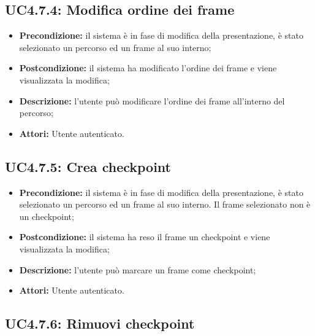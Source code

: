 \subsection{ UC4.7.4: Modifica ordine dei frame}

\begin{itemize}
	\item \textbf{Precondizione:} il sistema è in fase di modifica della presentazione, è stato selezionato un percorso ed un frame al suo interno;
	\item \textbf{Postcondizione:} il sistema ha modificato l'ordine dei frame e viene visualizzata la modifica;
	\item \textbf{Descrizione:} l'utente può modificare l'ordine dei frame all'interno del percorso;
	\item \textbf{Attori:} Utente autenticato.
\end{itemize}
\subsection{ UC4.7.5: Crea checkpoint}

\begin{itemize}
	\item \textbf{Precondizione:} il sistema è in fase di modifica della presentazione, è stato selezionato un percorso ed un frame al suo interno. Il frame selezionato non è un checkpoint;
	\item \textbf{Postcondizione:} il sistema ha reso il frame un checkpoint e viene visualizzata la modifica;
	\item \textbf{Descrizione:} l'utente può marcare un frame come checkpoint;
	\item \textbf{Attori:} Utente autenticato.
\end{itemize}
\subsection{ UC4.7.6: Rimuovi checkpoint}

